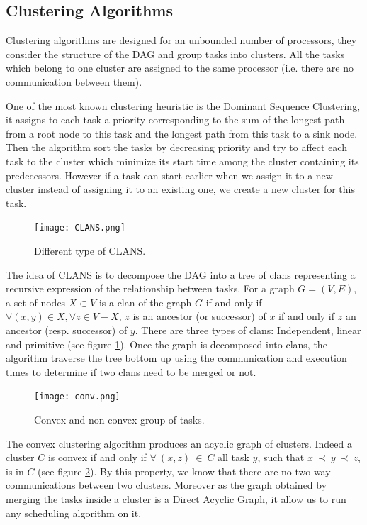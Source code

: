 \documentclass[10pt, conference, compsocconf,pdftex,dvipsnames]{IEEEtran}
\begin{document}
\subsection{Clustering Algorithms}

Clustering algorithms are designed for an unbounded number of processors, they
consider the structure of the DAG and group tasks into clusters. All the
tasks which belong to one cluster are assigned to the same processor (i.e. 
there are no communication between them).  

One of the most known clustering heuristic is the Dominant Sequence
Clustering\cite{yang1994dsc}, it assigns to each task a priority corresponding
to the sum of the longest path from a root node to this task and the longest
path from this task to a sink node. Then the algorithm sort the tasks by
decreasing priority and try to affect each task to the cluster which minimize
its start time among the cluster containing its predecessors. However if a
task can start earlier when we assign it to a new cluster instead of assigning
it to an existing one, we create a new cluster for this task.
\begin{figure}[htb]
    \centering
    \texttt{[image: CLANS.png]}
    \caption{Different type of CLANS.}
    \label{fig:clans}
\end{figure}


The idea of CLANS
\cite{aubum1990efficient,mccreary1993partitioning,mccreary1993graph} is to
decompose the DAG into a tree of clans representing a recursive expression of
the relationship between tasks. For a graph $G=(V,E)$, a set of nodes
$X\subset V$ is a clan of the graph $G$ if and only if $\forall (x,y) \in X,
\forall z \in V-X$, $z$ is an ancestor (or successor) of $x$ if and only if
$z$ an ancestor (resp. successor) of $y$. There are three types of clans:
Independent, linear and primitive (see figure \ref{fig:clans}). Once the graph
is decomposed into clans, the algorithm traverse the tree bottom up using the
communication and execution times to determine if two clans need to be merged
or not.

\begin{figure}[htb]
    \centering
    \texttt{[image: conv.png]}
    \caption{Convex and non convex group of tasks.}
    \label{fig:conv}
\end{figure}


The convex clustering algorithm\cite{lepere2002new} produces an acyclic graph
of clusters.  Indeed a cluster $C$ is convex if and only if $\forall\ (x,z)\
\in\ C$ all task $y$, such that $x\ \prec\ y\ \prec\ z$, is in $C$ (see
figure \ref{fig:conv}). By this property, we know that there are no two way
communications between two clusters. Moreover as the graph obtained by merging
the tasks inside a cluster is a Direct Acyclic Graph, it allow us to run
any scheduling algorithm on it.
\end{document}
